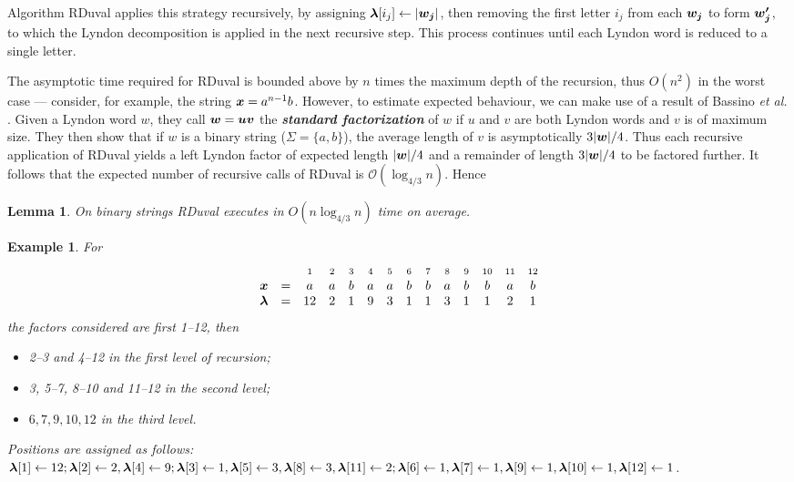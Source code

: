 \documentclass[10pt]{llncs}
\newtheorem{lemm}[thrm]{Lemma}
\newtheorem{examp}[thrm]{Example}
\def\s#1{\mbox{\boldmath $#1$}}
\def\itbf#1{\textit{\textbf{#1}}}
\def\la{\leftarrow}
\def\O{\mathcal{O}}
\begin{document}
Algorithm RDuval applies this strategy recursively,
by assigning $\s{\lambda}[i_j] \la |\s{w_j}|$,
then removing the first letter $i_j$ from each $\s{w_j}$ to form $\s{w'_j}$,
to which the Lyndon decomposition is applied in the next recursive step.
This process continues until each Lyndon word is reduced to a single letter.

The asymptotic time required for RDuval is bounded above by
$n$ times the maximum depth of the recursion, thus $O(n^2)$ in the worst case --- 
consider, for example, the string $\s{x} = a^{n-1}b$.
However, to estimate expected behaviour, we can make use of a result
of Bassino {\it et al.} \cite{BassinoCN05}.
Given a Lyndon word \s{w}, they call $\s{w} = \s{uv}$
the \itbf{standard factorization} of \s{w} if \s{u} and \s{v}
are both Lyndon words and \s{v} is of maximum size.
They then show that if \s{w} is a binary string ($\Sigma = \{a,b\}$),
the average length of \s{v} is asymptotically $3|\s{w}|/4$.
Thus each recursive application of RDuval yields a left Lyndon factor
of expected length $|\s{w}|/4$
and a remainder of length $3|\s{w}|/4$ to be factored further.
It follows that the expected number of recursive calls
of RDuval is $\O(\log_{4/3} n)$.  Hence
\begin{lemm}
\label{lemm-RD}
On binary strings
RDuval executes in $O(n\log_{4/3} n)$ time on average.
\end{lemm}
\begin{examp}
For
\begin{equation*}
\label{ex1}
 \begin{array}{cccccccccccccc}
& & \scriptstyle 1 & \scriptstyle 2 & \scriptstyle 3 & \scriptstyle 4 & \scriptstyle 5 & \scriptstyle 6 & \scriptstyle 7 & \scriptstyle 8 & \scriptstyle 9 & \scriptstyle 10 & \scriptstyle 11 & \scriptstyle 12 \\ 
\s{x} & = & a & a & b & a & a & b & b & a & b & b & a & b \\ 
\s{\lambda} & = & 12 & 2 & 1 & 9 & 3 & 1 & 1 & 3 & 1 & 1 & 2 & 1
\end{array}
\end{equation*}
the factors considered are first 1--12, then
\begin{itemize}
\item[$\bullet$]
2--3 and 4--12 in the  first level of recursion;
\item[$\bullet$]
3, 5--7, 8--10 and 11--12 in the second level;
\item[$\bullet$]
$6,7,9,10,12$ in the third level.
\end{itemize}
Positions are assigned as follows:
$\s{\lambda}[1] \la 12; \s{\lambda}[2] \la 2, \s{\lambda}[4] \la 9;
\s{\lambda}[3] \la 1, \s{\lambda}[5] \la 3, \s{\lambda}[8] \la 3, \s{\lambda}[11] \la 2;
\s{\lambda}[6] \la 1, \s{\lambda}[7] \la 1, \s{\lambda}[9] \la 1,
\s{\lambda}[10] \la 1, \s{\lambda}[12] \la 1$.
\end{examp}
\end{document}
